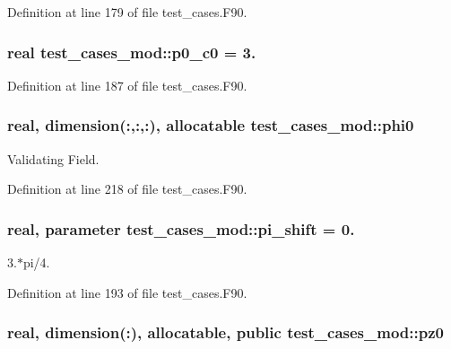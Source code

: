 Definition at line 179 of file test\-\_\-cases.\-F90.

\subsubsection[{p0\-\_\-c0}]{\setlength{\rightskip}{0pt plus 5cm}real test\-\_\-cases\-\_\-mod\-::p0\-\_\-c0 = 3.\hspace{0.3cm}{\ttfamily [private]}}\label{classtest__cases__mod_ab4fbd1f2da9a9bedc6197a62d77e4f57}


Definition at line 187 of file test\-\_\-cases.\-F90.

\subsubsection[{phi0}]{\setlength{\rightskip}{0pt plus 5cm}real, dimension(\-:,\-:,\-:), allocatable test\-\_\-cases\-\_\-mod\-::phi0\hspace{0.3cm}{\ttfamily [private]}}\label{classtest__cases__mod_a1bc1841e0de13798d6a15b088b9190fe}


Validating Field. 



Definition at line 218 of file test\-\_\-cases.\-F90.

\subsubsection[{pi\-\_\-shift}]{\setlength{\rightskip}{0pt plus 5cm}real, parameter test\-\_\-cases\-\_\-mod\-::pi\-\_\-shift = 0.\hspace{0.3cm}{\ttfamily [private]}}\label{classtest__cases__mod_ac52bff5875e95e0bc36377a076e3ba63}


3.$\ast$pi/4. 



Definition at line 193 of file test\-\_\-cases.\-F90.

\subsubsection[{pz0}]{\setlength{\rightskip}{0pt plus 5cm}real, dimension(\-:), allocatable, public test\-\_\-cases\-\_\-mod\-::pz0}\label{classtest__cases__mod_a829a6dcd90e3fecd02c918dc2d107c7e}


